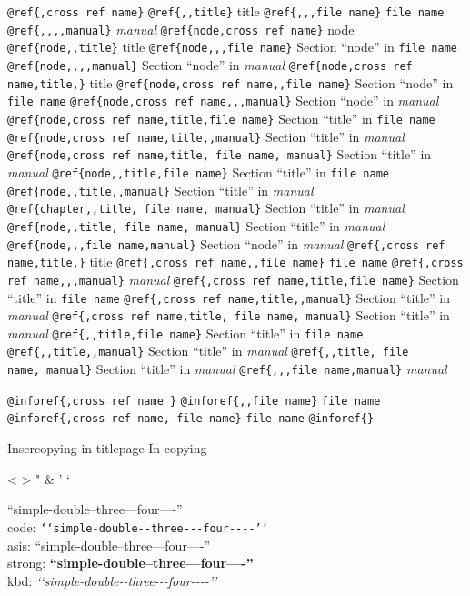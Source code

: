 \documentclass{book}
\newcommand\Texinfocommandstyletextkbd[1]{{\ttfamily\textsl{#1}}}%
\renewcommand{\_}{\Texinfounderscore\discretionary{}{}{}}
\begin{document}
\begin{titlepage}
{\texttt{@ref\{,cross ref name\}} 
\texttt{@ref\{{,}{,}title\}} title
\texttt{@ref\{{,}{,},file name\}} \texttt{file name}
\texttt{@ref\{{,}{,}{,}{,}manual\}} \textsl{manual}
\texttt{@ref\{node,cross ref name\}} node
\texttt{@ref\{node{,}{,}title\}} title
\texttt{@ref\{node{,}{,},file name\}} Section ``node'' in \texttt{file name}
\texttt{@ref\{node{,}{,}{,}{,}manual\}} Section ``node'' in \textsl{manual}
\texttt{@ref\{node,cross ref name,title,\}} title
\texttt{@ref\{node,cross ref name{,}{,}file name\}} Section ``node'' in \texttt{file name}
\texttt{@ref\{node,cross ref name{,}{,},manual\}} Section ``node'' in \textsl{manual}
\texttt{@ref\{node,cross ref name,title,file name\}} Section ``title'' in \texttt{file name}
\texttt{@ref\{node,cross ref name,title{,}{,}manual\}} Section ``title'' in \textsl{manual}
\texttt{@ref\{node,cross ref name,title,\ file name,\ manual\}} Section ``title'' in \textsl{manual}
\texttt{@ref\{node{,}{,}title,file name\}} Section ``title'' in \texttt{file name}
\texttt{@ref\{node{,}{,}title{,}{,}manual\}} Section ``title'' in \textsl{manual}
\texttt{@ref\{chapter{,}{,}title,\ file name,\ manual\}} Section ``title'' in \textsl{manual}
\texttt{@ref\{node{,}{,}title,\ file name,\ manual\}} Section ``title'' in \textsl{manual}
\texttt{@ref\{node{,}{,},file name,manual\}} Section ``node'' in \textsl{manual}
\texttt{@ref\{,cross ref name,title,\}} title
\texttt{@ref\{,cross ref name{,}{,}file name\}} \texttt{file name}
\texttt{@ref\{,cross ref name{,}{,},manual\}} \textsl{manual}
\texttt{@ref\{,cross ref name,title,file name\}} Section ``title'' in \texttt{file name}
\texttt{@ref\{,cross ref name,title{,}{,}manual\}} Section ``title'' in \textsl{manual}
\texttt{@ref\{,cross ref name,title,\ file name,\ manual\}} Section ``title'' in \textsl{manual}
\texttt{@ref\{{,}{,}title,file name\}} Section ``title'' in \texttt{file name}
\texttt{@ref\{{,}{,}title{,}{,}manual\}} Section ``title'' in \textsl{manual}
\texttt{@ref\{{,}{,}title,\ file name,\ manual\}} Section ``title'' in \textsl{manual}
\texttt{@ref\{{,}{,},file name,manual\}} \textsl{manual}

\texttt{@inforef\{,cross ref name \}} 
\texttt{@inforef\{{,}{,}file name\}} \texttt{file name}
\texttt{@inforef\{,cross ref name,\ file name\}} \texttt{file name}
\texttt{@inforef\{\}} 



Insercopying in titlepage
In copying

<
>
"
\&
'
`

``simple-double--three---four----''\leavevmode{}\\
code: \texttt{{`}{`}simple-double{-}{-}three{-}{-}{-}four{-}{-}{-}-{'}{'}} \leavevmode{}\\
asis: ``simple-double--three---four----'' \leavevmode{}\\
strong: \textbf{``simple-double--three---four----''} \leavevmode{}\\
kbd: \Texinfocommandstyletextkbd{{`}{`}simple-double{-}{-}three{-}{-}{-}four{-}{-}{-}-{'}{'}} \leavevmode{}\\

}
\end{titlepage}
\end{document}
